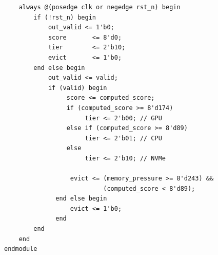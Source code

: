 \documentclass[12pt,a4paper]{report}
\begin{document}
\begin{lstlisting}
    always @(posedge clk or negedge rst_n) begin
        if (!rst_n) begin
            out_valid <= 1'b0;
            score       <= 8'd0;
            tier        <= 2'b10;
            evict       <= 1'b0;
        end else begin
            out_valid <= valid;
            if (valid) begin
                 score <= computed_score;
                 if (computed_score >= 8'd174)
                      tier <= 2'b00; // GPU
                 else if (computed_score >= 8'd89)
                      tier <= 2'b01; // CPU
                 else
                      tier <= 2'b10; // NVMe

                  evict <= (memory_pressure >= 8'd243) &&
                           (computed_score < 8'd89);
              end else begin
                  evict <= 1'b0;
              end
        end
    end
endmodule
\end{lstlisting}
\clearpage\listoftables\clearpage\listoffigures\clearpage\glsaddall\printglossary[title={Glossary}]\clearpage\printindex
\end{document}
